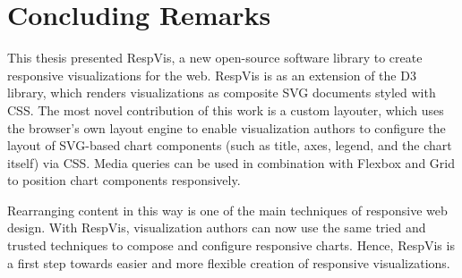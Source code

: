 \chapter{Concluding Remarks}
\label{chap:Concl}

This thesis presented RespVis, a new open-source software library to
create responsive visualizations for the web. RespVis is as an
extension of the D3 library, which renders visualizations as composite
SVG documents styled with CSS. The most novel contribution of this
work is a custom layouter, which uses the browser's own layout engine
to enable visualization authors to configure the layout of SVG-based
chart components (such as title, axes, legend, and the chart itself)
via CSS. Media queries can be used in combination with Flexbox and
Grid to position chart components responsively.

Rearranging content in this way is one of the main techniques of
responsive web design. With RespVis, visualization authors can now use
the same tried and trusted techniques to compose and configure
responsive charts. Hence, RespVis is a first step towards easier and
more flexible creation of responsive visualizations.

